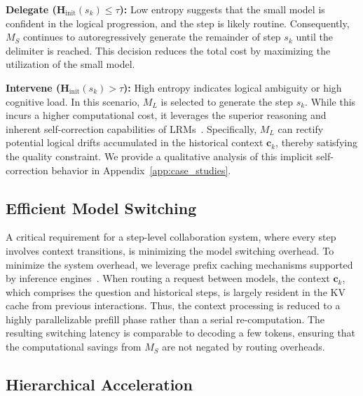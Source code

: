 \documentclass[11pt]{article}
\newcommand{\todoc}[2]{{\textcolor{#1}{{[#2]}}}}
\newcommand{\todoviolet}[1]{\todoc{violet}{\textbf{#1}}}
\newcommand{\zeng}[1]{\textcolor[rgb]{1,0.66,0}{\textbf{[Zeng: #1]}}}
\newcommand{\shi}[1]{\todoviolet{Shi: #1}}
\begin{document}
\noindent \textbf{Delegate ($\mathbf{H}_\text{init}(s_k) \le \tau$):} Low entropy suggests that the small model is confident in the logical progression, and the step is likely routine. Consequently, $M_S$ continues to autoregressively generate the remainder of step $s_k$ until the delimiter is reached. This decision reduces the total cost by maximizing the utilization of the small model.

\noindent \textbf{Intervene ($\mathbf{H}_\text{init}(s_k) > \tau$):} High entropy indicates logical ambiguity or high cognitive load. In this scenario, $M_L$ is selected to generate the step $s_k$. While this incurs a higher computational cost, it leverages the superior reasoning and inherent self-correction capabilities of LRMs~\cite{guo2025deepseek}. Specifically, $M_L$ can rectify potential logical drifts accumulated in the historical context $\mathbf{c}_k$, thereby satisfying the quality constraint. We provide a qualitative analysis of this implicit self-correction behavior in Appendix~\ref{app:case_studies}. 


\subsection{Efficient Model Switching}
A critical requirement for a step-level collaboration system, where every step involves context transitions, is minimizing the model switching overhead. To minimize the system overhead, we leverage prefix caching mechanisms supported by inference engines~\cite{kwon2023efficient, zheng2024sglang}.  
When routing a request between models, the context $\mathbf{c}_k$, which comprises the question and historical steps, is largely resident in the KV cache from previous interactions. Thus, the context processing is reduced to a highly parallelizable prefill phase rather than a serial re-computation. The resulting switching latency is comparable to decoding a few tokens, ensuring that the computational savings from $M_S$ are not negated by routing overheads.

\subsection{Hierarchical Acceleration}
\label{ssec:hierarchical}
\end{document}
